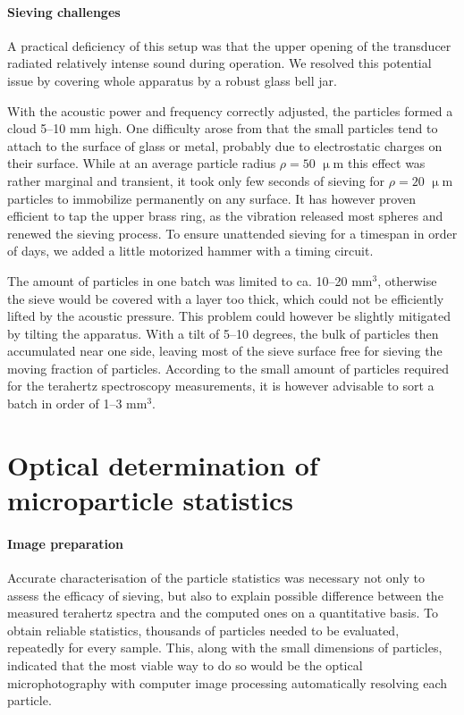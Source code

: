 \paragraph{Sieving challenges}%
A practical deficiency of this setup was that the upper opening of the transducer radiated relatively intense sound during operation. We resolved this potential issue by covering whole apparatus by a robust glass bell jar.

With the acoustic power and frequency correctly adjusted, the particles formed a cloud 5--10 mm high. One difficulty arose from that the small particles tend to attach to the surface of glass or metal, probably due to electrostatic charges on their surface. While at an average particle radius $\rho = 50$ $\upmu$m this effect was rather marginal and transient, it took only few seconds of sieving for $\rho = 20$ $\upmu$m particles to immobilize permanently on any surface. It has however proven efficient to tap the upper brass ring, as the vibration released most spheres and renewed the sieving process. To ensure unattended sieving for a timespan in order of days, we added a little motorized hammer with a timing circuit. %

The amount of particles in one batch was limited to ca. 10--20 mm$^{3}$, otherwise the sieve would be covered with a layer too thick, which could not be efficiently lifted by the acoustic pressure.
This problem could however be slightly mitigated by tilting the apparatus. With a tilt of 5--10 degrees, the bulk of particles then accumulated near one side, leaving most of the sieve surface free for sieving the moving fraction of particles. According to the small amount of particles required for the terahertz spectroscopy measurements, it is however advisable to sort a batch in order of 1--3 mm$^{3}$.

\section{Optical determination of microparticle statistics}
\paragraph{Image preparation} %
Accurate characterisation of the particle statistics was necessary not only to assess the efficacy of sieving, but also to explain possible difference between the measured terahertz spectra and the computed ones on a quantitative basis. To obtain reliable statistics, thousands of particles needed to be evaluated, repeatedly for every sample. This, along with the small dimensions of particles, indicated that the most viable way to do so would be the optical microphotography with computer image processing automatically resolving each particle.

